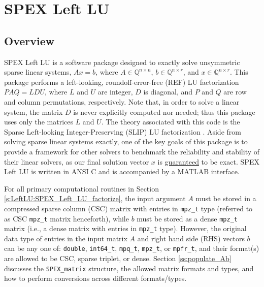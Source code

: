 \documentclass[12pt]{report}
\theoremstyle{definition}
\begin{document}
\chapter{SPEX Left LU} \label{ch:LeftLU}

\section{Overview} \label{s:LeftLU:intro}

SPEX Left LU is a software package designed to exactly solve unsymmetric sparse
linear systems, $ A x = b$, where $A \in \mathbb{Q}^{n \times
n}$, $b \in \mathbb{Q}^{n \times r}$, and $x \in \mathbb{Q}^{n \times
r}$. This package performs a left-looking, roundoff-error-free (REF) LU
factorization $P A Q = L D U$, where $L$ and $U$ are integer, $D$ is diagonal,
and $P$ and $Q$ are row and column permutations, respectively. 
Note that, in order to solve a linear system, the matrix $D$ is never explicitly computed nor needed; thus this 
package uses only the matrices $L$ and $U$. The theory associated with this code is the Sparse Left-looking Integer-Preserving (SLIP) LU factorization
 \cite{lourenco2019exact}. Aside from
solving sparse linear systems exactly, one of the key goals of this package is
to provide a framework for other solvers to benchmark the reliability and
stability of their linear solvers, as our final solution vector $x$ is
\ul{guaranteed} to be exact. SPEX Left LU is written in ANSI C and is accompanied by a MATLAB interface.

For all primary computational routines in Section \ref{s:LeftLU:SPEX_Left_LU_factorize}, the input
argument $A$ must be stored in a compressed sparse column (CSC) matrix with
entries in \verb|mpz_t| type (referred to as CSC \verb|mpz_t| matrix henceforth), while $b$ must be stored as a dense \verb|mpz_t| matrix (i.e., a
dense matrix with entries in \verb|mpz_t| type).  However, the original data type of entries in the input matrix $A$ and right hand side (RHS) vectors $b$ can be any one of: \verb|double|, \verb|int64_t|, \verb|mpq_t|,
\verb|mpz_t|, or \verb|mpfr_t|, and their format(s) are allowed to be 
CSC, sparse triplet, or dense. Section \ref{ss:populate_Ab} discusses the \verb|SPEX_matrix| structure, the allowed matrix formats and types, and how to perform conversions across different formats/types.
\end{document}
